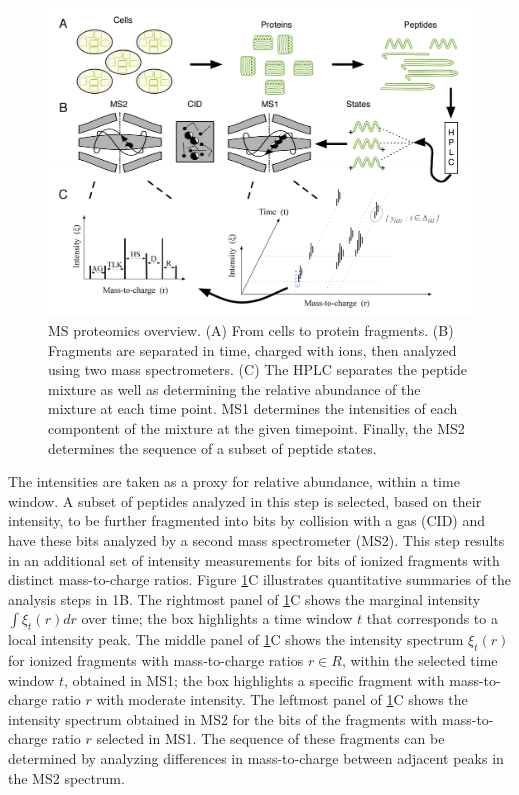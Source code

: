 \begin{figure}[t]
 \centering
 \includegraphics[width=\textwidth]{figures/proteomics/MS_Overview_small}
 \caption{MS proteomics overview. 
 (A) From cells to protein fragments. 
 (B) Fragments are separated in time, charged with ions, then analyzed using two mass spectrometers.
 (C) The HPLC separates the peptide
mixture as well as determining the relative abundance of the mixture
at each time point. MS1 determines the intensities of each compontent
of the mixture at the given timepoint. Finally, the MS2 determines
the sequence of a subset of peptide states.}
 \label{proteomics:fig:Mass_Spec_Overview}
\end{figure}
%
The intensities are taken as a proxy for relative abundance, within a time window. %
A subset of peptides analyzed in this step is selected, based on their intensity, to be further fragmented into bits by collision with a gas (CID) and have these bits analyzed by a second mass spectrometer (MS2). 
This step results in an additional set of intensity measurements for bits of ionized fragments with distinct mass-to-charge ratios.
Figure \ref{proteomics:fig:Mass_Spec_Overview}C illustrates quantitative summaries of the analysis steps in 1B.
The rightmost panel of \ref{proteomics:fig:Mass_Spec_Overview}C shows the marginal intensity $\int\xi_t(r)dr$ over time; the box highlights a time window $t$ that corresponds to a local intensity peak.
The middle panel of \ref{proteomics:fig:Mass_Spec_Overview}C shows the intensity spectrum $\xi_t(r)$ for ionized fragments with mass-to-charge ratios $r\in R$, within the selected time window $t$, obtained in MS1; the box highlights a specific fragment with mass-to-charge ratio $r$ with moderate intensity.
The leftmost panel of \ref{proteomics:fig:Mass_Spec_Overview}C shows the intensity spectrum obtained in MS2 for the bits of the fragments with mass-to-charge ratio $r$ selected in MS1. The sequence of these fragments can be determined by analyzing differences in mass-to-charge between adjacent peaks in the MS2 spectrum.

